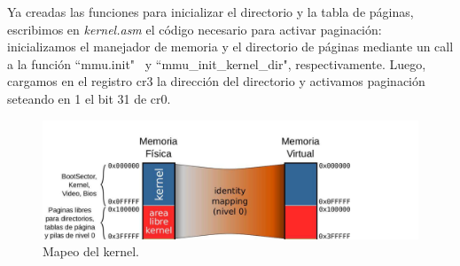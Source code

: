 \documentclass[a4paper]{article}
\begin{document}
\justify  
Ya creadas las funciones para inicializar el directorio y la tabla de páginas, escribimos en \textit{kernel.asm} el código necesario para activar paginación: inicializamos el manejador de memoria y el directorio de páginas mediante un call a la función ``mmu.init" \ y ``mmu_init_kernel_dir", respectivamente. Luego, cargamos en el registro cr3 la dirección del directorio y activamos paginación seteando en 1 el bit 31 de cr0.

\begin{figure}[h]
	\centering
	\includegraphics[scale=0.5]{img/MapearKernel.pdf}
	\caption{Mapeo del kernel.}
\end{figure}

\newpage
\end{document}
